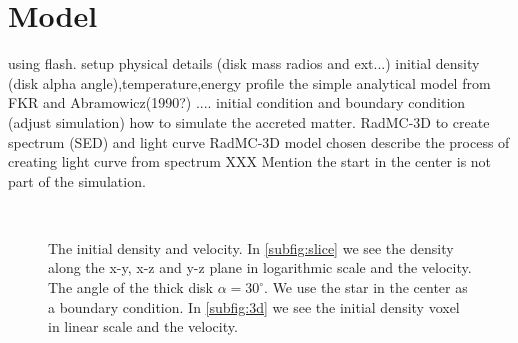 \documentclass[a4paper,fleqn,usenatbib,useAMS]{mnras}
\begin{document}
\section{Model}
\label{sec:model}

using flash.
setup physical details (disk mass radios and ext...)
initial density (disk alpha angle),temperature,energy profile
the simple analytical model from FKR \cite{2002apa..book.....F} and Abramowicz(1990?) \cite{1988MNRAS.232....1F,1991ApJ...370L..35A}  ....
initial condition and boundary condition (adjust simulation)
how to simulate the accreted matter.
RadMC-3D to create spectrum (SED) and light curve
RadMC-3D model chosen
describe the process of creating light curve from spectrum
XXX Mention the start in the center is not part of the simulation.
\begin{figure}
    \begin{center}
     \\
    \end{center}
    \caption{
        The initial density and velocity. 
        In \ref{subfig:slice} we see the density along the x-y, x-z and y-z plane in logarithmic scale and the velocity. 
        The angle of the thick disk $\alpha=30^\circ$. 
        We use the star in the center as a boundary condition.
        In \ref{subfig:3d} we see the initial density voxel in linear scale and the velocity. 
        }
    \label{fig:initial_condition}
\end{figure}
\end{document}
